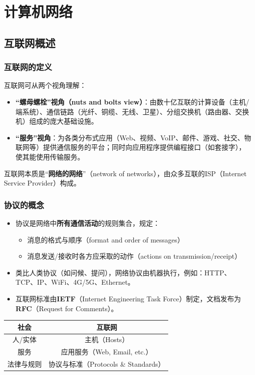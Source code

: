 \section{计算机网络}

\subsection{互联网概述}

\subsubsection{互联网的定义}

互联网可从两个视角理解：
\begin{itemize}
    \item \textbf{“螺母螺栓”视角（nuts and bolts view）}：由数十亿互联的计算设备（主机/端系统）、通信链路（光纤、铜缆、无线、卫星）、分组交换机（路由器、交换机）组成的庞大基础设施。
    \item \textbf{“服务”视角}：为各类分布式应用（Web、视频、VoIP、邮件、游戏、社交、物联网等）提供通信服务的平台；同时向应用程序提供编程接口（如套接字），使其能使用传输服务。
\end{itemize}

互联网本质是“\textbf{网络的网络}”（network of networks），由众多互联的ISP（Internet Service Provider）构成。

\subsubsection{协议的概念}

\begin{itemize}
    \item 协议是网络中\textbf{所有通信活动}的规则集合，规定：
          \begin{itemize}
              \item 消息的格式与顺序（format and order of messages）
              \item 消息发送/接收时各方应采取的动作（actions on transmission/receipt）
          \end{itemize}
    \item 类比人类协议（如问候、提问），网络协议由机器执行，例如：HTTP、TCP、IP、WiFi、4G/5G、Ethernet。
    \item 互联网标准由\textbf{IETF}（Internet Engineering Task Force）制定，文档发布为\textbf{RFC}（Request for Comments）。
\end{itemize}

\begin{center}
    \begin{tabular}{c|c}
        社会    & 互联网                           \\
        \hline
        人/实体  & 主机（Hosts）                     \\
        服务    & 应用服务（Web, Email, etc.）        \\
        法律与规则 & 协议与标准（Protocols \& Standards） \\
    \end{tabular}
\end{center}

